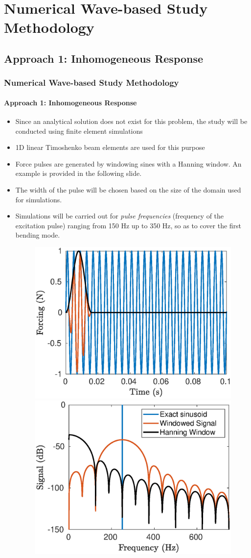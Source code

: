 \documentclass[aspectratio=169]{beamertmd}
\begin{document}
\section{Numerical Wave-based Study Methodology}
\label{sec:numerical-wave-based}

\subsection{Approach 1: Inhomogeneous Response}
\label{sec:appr-1:-inhom}

\begin{frame}[allowframebreaks]
  \frametitle{Numerical Wave-based Study Methodology}
  \framesubtitle{Approach 1: Inhomogeneous Response}
  \begin{itemize}
  \item Since an analytical solution does not exist for this problem,
    the study will be conducted using finite element simulations
  \item 1D linear Timoshenko beam elements are used for this purpose
  \item Force pulses are generated by windowing sines with a Hanning 
    window. An example is provided in the following slide.
  \item The width of the pulse will be chosen based on the size of the
    domain used for simulations.
  \item Simulations will be carried out for \emph{pulse frequencies}
    (frequency of the excitation pulse) ranging from 150 Hz up to 350
    Hz, so as to cover the first bending mode. 
    \pagebreak
    \begin{figure}[!h]
      \centering
      \includegraphics[width=0.5\linewidth]{../../PLANARMODEL/FIGS/HNWSIG_T}%
      \includegraphics[width=0.5\linewidth]{../../PLANARMODEL/FIGS/HNWSIG_F}

\end{figure}
\end{itemize}
\end{frame}
\end{document}
